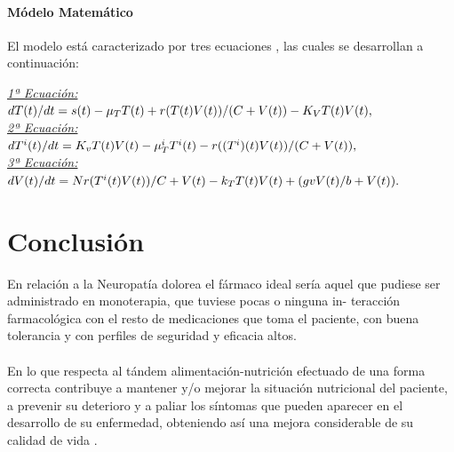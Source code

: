\documentclass[a4paper,twocolumn,10pt]{article}
\begin{document}
\paragraph{Módelo Matemático} 
El modelo está caracterizado por tres ecuaciones \cite{Kirschner1996}, las cuales se desarrollan a continuación: \\
\begin{center}
\doublespacing
{\itshape \underline{1ª Ecuación:}} \\
$dT(t)/dt = s(t)-\mu_TT(t)+ \\ 
r(T(t)V(t))/(C+V(t))- K_VT(t)V(t),$ \\ 
{\itshape \underline {2ª Ecuación:}} \\
$dT^i(t)/dt = K_vT(t)V(t)-\mu_T^iT^i(t)-\\
r((T^i)(t)V(t))/(C+V(t)),$ \\
{\itshape \underline {3ª Ecuación:}} \\
$dV(t)/dt=Nr(T^i(t)V(t))/C+V(t)-k_TT(t)V(t)+ \\
(gvV(t)/b+V(t)). $ \\
\end{center}
\section{Conclusión}
En relación a la Neuropatía dolorea el fármaco ideal sería aquel que pudiese ser administrado en monoterapia, que tuviese pocas o ninguna in-
teracción farmacológica con el resto de medicaciones que toma el paciente, con buena tolerancia y con perfiles de seguridad y eficacia altos. \\ \\
En lo que respecta al tándem alimentación-nutrición efectuado de una forma correcta contribuye a mantener y/o mejorar la situación nutricional del paciente, a prevenir su deterioro y a paliar los síntomas que pueden aparecer en el desarrollo de su enfermedad, obteniendo así una mejora considerable de su calidad de vida \cite{Herrera2004}.


\end{document}
